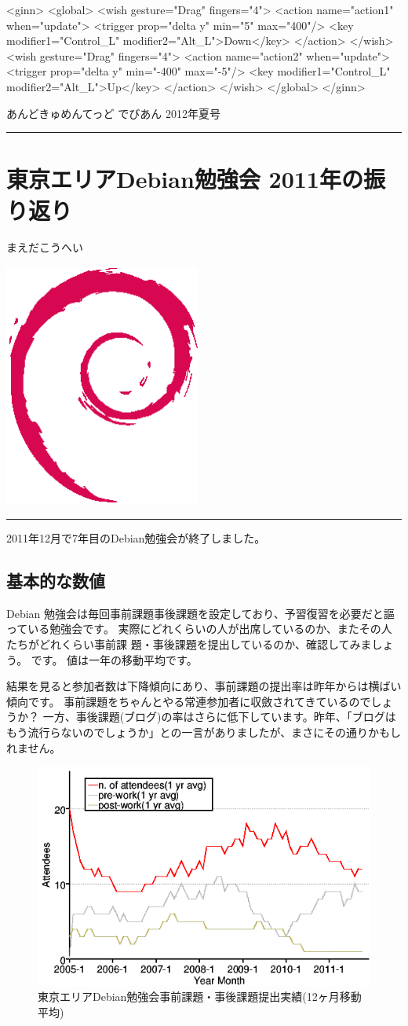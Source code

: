 \documentclass[mingoth,a4paper]{jsarticle}
\renewcommand{\dancersection}[2]{%
\newpage
あんどきゅめんてっど でびあん 2012年夏号
%
\vspace{0.1mm}\\
{\color{dancerdarkblue}\rule{\hsize}{2mm}}

%
%
\begin{minipage}[t]{0.6\hsize}
\color{dancerdarkblue}
\vspace{1cm}
\section{#1}
\hfill{}#2\\
\end{minipage}
\begin{minipage}[t]{0.4\hsize}
\vspace{-2cm}
\hfill{}\includegraphics[height=8cm]{image200502/openlogo-nd.eps}\\
\vspace{-5cm}
\end{minipage}
%
{\color{dancerlightblue}\rule{0.66\hsize}{2mm}}
%
\vspace{2cm}
}
\begin{document}
\begin{commandline}
<ginn>
  <global>
    <wish gesture="Drag" fingers="4">
      <action name="action1" when="update">
        <trigger prop="delta y" min="5" max="400"/>
        <key modifier1="Control_L" modifier2="Alt_L">Down</key>
      </action>
    </wish>
    <wish gesture="Drag" fingers="4">
      <action name="action2" when="update">
        <trigger prop="delta y" min="-400" max="-5"/>
        <key modifier1="Control_L" modifier2="Alt_L">Up</key>
      </action>
    </wish>
  </global>
</ginn>
\end{commandline}


\newpage
\clearpage


\dancersection{東京エリアDebian勉強会 2011年の振り返り}{まえだこうへい}

2011年12月で7年目のDebian勉強会が終了しました。

\subsection{基本的な数値}

Debian 勉強会は毎回事前課題事後課題を設定しており、予習復習を必要だと謳っている勉強会です。
実際にどれくらいの人が出席しているのか、またその人たちがどれくらい事前課
題・事後課題を提出しているのか、確認してみましょう。
です。
値は一年の移動平均です。

結果を見ると参加者数は下降傾向にあり、事前課題の提出率は昨年からは横ばい傾向です。
事前課題をちゃんとやる常連参加者に収斂されてきているのでしょうか？
一方、事後課題(ブログ)の率はさらに低下しています。昨年、「ブログはもう流行らないのでしょうか」との一言がありましたが、まさにその通りかもしれません。

\begin{figure}[ht]
\begin{center}
 \includegraphics[width=0.7\hsize]{image201112/memberanalysis/attend.png}
\caption{東京エリアDebian勉強会事前課題・事後課題提出実績(12ヶ月移動平均)}\label{fig:attendandprepostwork}
\end{center}
\end{figure}
\end{document}
